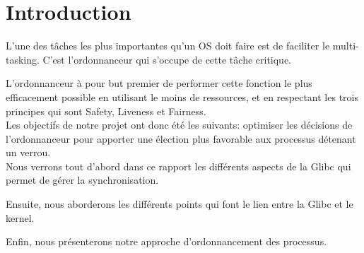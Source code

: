 \section*{Introduction}
L'une des tâches les plus importantes qu'un OS doit faire est de faciliter le
multi-tasking.
C'est l'ordonnanceur qui s'occupe de cette tâche critique.

L'ordonnanceur à pour but premier de performer cette fonction le plus
efficacement possible en utilisant le moins de ressources, et en respectant les
trois principes qui sont Safety, Liveness et Fairness.
\\

Les objectifs de notre projet ont donc été les suivants: optimiser les
décisions de l'ordonnanceur pour apporter une élection plus favorable aux
processus détenant un verrou.
\\

Nous verrons tout d'abord dans ce rapport les différents aspects de la Glibc
qui permet de gérer la synchronisation. 

Ensuite, nous aborderons les différents points qui font le lien entre la Glibc
et le kernel. 

Enfin, nous présenterons notre approche d'ordonnancement des processus.